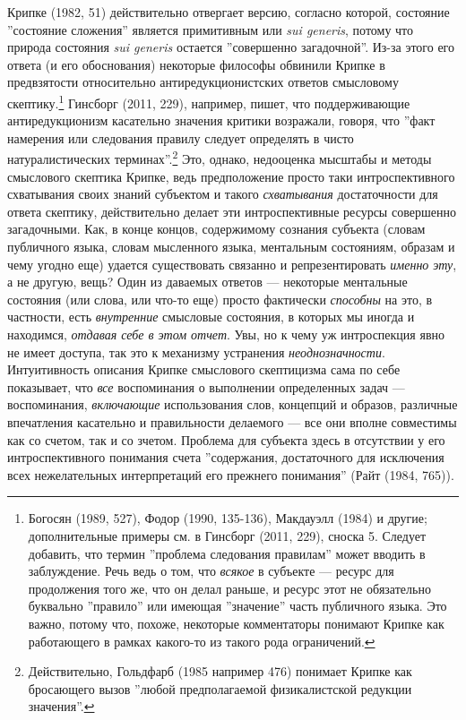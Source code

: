 \documentclass[11pt]{book}
\begin{document}
Крипке (1982, 51) действительно отвергает версию, согласно которой, состояние ''состояние сложения'' является примитивным или \textit{sui generis}, потому что природа состояния \textit{sui generis} остается ''совершенно загадочной''. Из-за этого его ответа (и его обоснования) некоторые философы обвинили Крипке в предвзятости относительно антиредукционистских ответов смысловому скептику.\footnote{Богосян (1989, 527), Фодор (1990, 135-136), Макдауэлл (1984) и другие; дополнительные примеры см. в Гинсборг (2011, 229), сноска 5. Следует добавить, что термин ''проблема следования правилам'' может вводить в заблуждение. Речь ведь о том, что \textit{всякое} в субъекте --- ресурс для продолжения того же, что он делал раньше, и ресурс этот не обязательно буквально ''правило'' или имеющая ''значение'' часть публичного языка. Это важно, потому что, похоже, некоторые комментаторы понимают Крипке как работающего в рамках какого-то из такого рода ограничений.} Гинсборг (2011, 229), например, пишет, что поддерживающие антиредукционизм касательно значения критики возражали, говоря, что ''факт намерения или следования правилу следует определять в чисто натуралистических терминах''.\footnote{Действительно, Гольдфарб (1985 например 476) понимает Крипке как бросающего вызов ''любой предполагаемой физикалистской редукции значения''.} Это, однако, недооценка мысштабы и методы смыслового скептика Крипке, ведь предположение просто таки интроспективного схватывания своих знаний субъектом и такого \textit{схватывания} достаточности для ответа скептику, действительно делает эти интроспективные ресурсы совершенно загадочными. Как, в конце концов, содержимому сознания субъекта (словам публичного языка, словам мысленного языка, ментальным состояниям, образам и чему угодно еще) удается существовать связанно и репрезентировать \textit{именно эту}, а не другую, вещь? Один из даваемых ответов --- некоторые ментальные состояния (или слова, или что-то еще) просто фактически \textit{способны} на это, в частности, есть \textit{внутренние} смысловые состояния, в которых мы иногда и находимся, \textit{отдавая себе в этом отчет}. Увы, но к чему уж интроспекция явно не имеет доступа, так это к механизму устранения \textit{неоднозначности}. Интуитивность описания Крипке смыслового скептицизма сама  по себе показывает, что \textit{все} воспоминания о выполнении определенных задач --- воспоминания, \textit{включающие} использования слов, концепций и образов, различные впечатления касательно  и правильности делаемого --- все они вполне совместимы как со счетом, так и со зчетом. Проблема для субъекта здесь в отсутствии у его интроспективного понимания счета ''содержания, достаточного для исключения всех нежелательных интерпретаций его прежнего понимания'' (Райт (1984, 765)).
\end{document}
